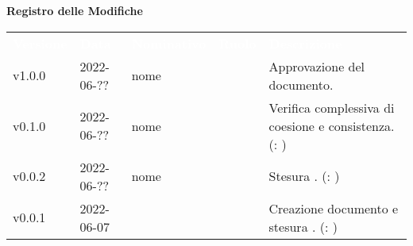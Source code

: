

{\LARGE{\textbf{Registro delle Modifiche}}} \\
\begin{table}[!htbp]
\renewcommand{\arraystretch}{1.5}
\begin{tabular}{ m{}<{\centering}  m{}<{\centering}  m{}<{\centering}  m{}<{\centering}  m{}<{\centering} }
	\rowcolor{darkblue}
	\textcolor{white}{\textbf{Versione}} &\textcolor{white}{\textbf{Data}}& \textcolor{white}{\textbf{Nominativo}} & \textcolor{white}{\textbf{Ruolo}}&\textcolor{white}{\textbf{Descrizione}}\\ 

	v1.0.0 & 2022-06-?? & nome & \RE & Approvazione del documento. \\

	v0.1.0& 2022-06-?? & nome & \AN & Verifica complessiva di coesione e consistenza.  (\VE: \textit{})\\
	
	v0.0.2& 2022-06-?? & nome & \AN & Stesura .  (\VE: \textit{})\\

	v0.0.1& 2022-06-07 & \PV & \AN & Creazione documento e stesura .  (\VE: \textit{})\\
	
	
\end{tabular}
\end{table}

\pagebreak